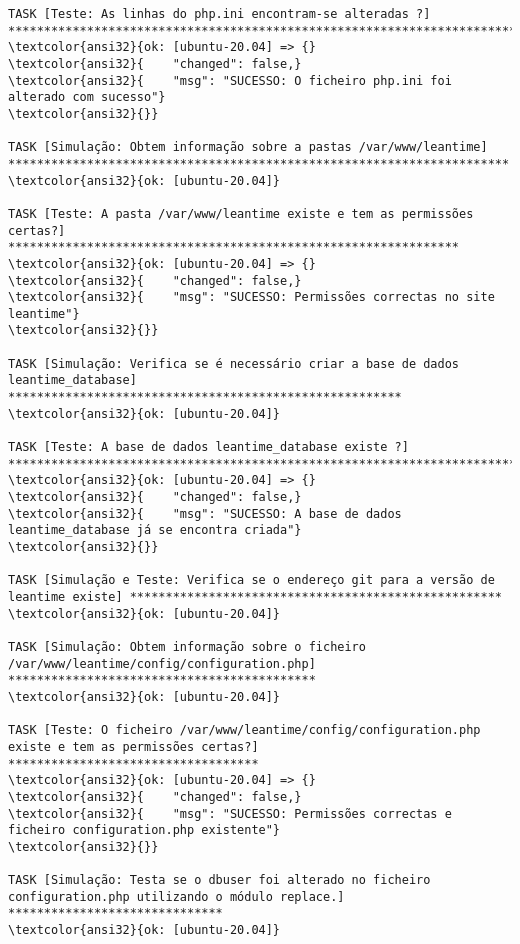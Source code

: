 \documentclass{scrartcl}
\begin{document}
\begin{Verbatim}
TASK [Teste: As linhas do php.ini encontram-se alteradas ?] ******************************************************************************
\textcolor{ansi32}{ok: [ubuntu-20.04] => {}
\textcolor{ansi32}{    "changed": false,}
\textcolor{ansi32}{    "msg": "SUCESSO: O ficheiro php.ini foi alterado com sucesso"}
\textcolor{ansi32}{}}

TASK [Simulação: Obtem informação sobre a pastas /var/www/leantime] **********************************************************************
\textcolor{ansi32}{ok: [ubuntu-20.04]}

TASK [Teste: A pasta /var/www/leantime existe e tem as permissões certas?] ***************************************************************
\textcolor{ansi32}{ok: [ubuntu-20.04] => {}
\textcolor{ansi32}{    "changed": false,}
\textcolor{ansi32}{    "msg": "SUCESSO: Permissões correctas no site leantime"}
\textcolor{ansi32}{}}

TASK [Simulação: Verifica se é necessário criar a base de dados leantime_database] *******************************************************
\textcolor{ansi32}{ok: [ubuntu-20.04]}

TASK [Teste: A base de dados leantime_database existe ?] *********************************************************************************
\textcolor{ansi32}{ok: [ubuntu-20.04] => {}
\textcolor{ansi32}{    "changed": false,}
\textcolor{ansi32}{    "msg": "SUCESSO: A base de dados leantime_database já se encontra criada"}
\textcolor{ansi32}{}}

TASK [Simulação e Teste: Verifica se o endereço git para a versão de leantime existe] ****************************************************
\textcolor{ansi32}{ok: [ubuntu-20.04]}

TASK [Simulação: Obtem informação sobre o ficheiro /var/www/leantime/config/configuration.php] *******************************************
\textcolor{ansi32}{ok: [ubuntu-20.04]}

TASK [Teste: O ficheiro /var/www/leantime/config/configuration.php existe e tem as permissões certas?] ***********************************
\textcolor{ansi32}{ok: [ubuntu-20.04] => {}
\textcolor{ansi32}{    "changed": false,}
\textcolor{ansi32}{    "msg": "SUCESSO: Permissões correctas e ficheiro configuration.php existente"}
\textcolor{ansi32}{}}

TASK [Simulação: Testa se o dbuser foi alterado no ficheiro configuration.php utilizando o módulo replace.] ******************************
\textcolor{ansi32}{ok: [ubuntu-20.04]}


\end{Verbatim}
\end{document}
